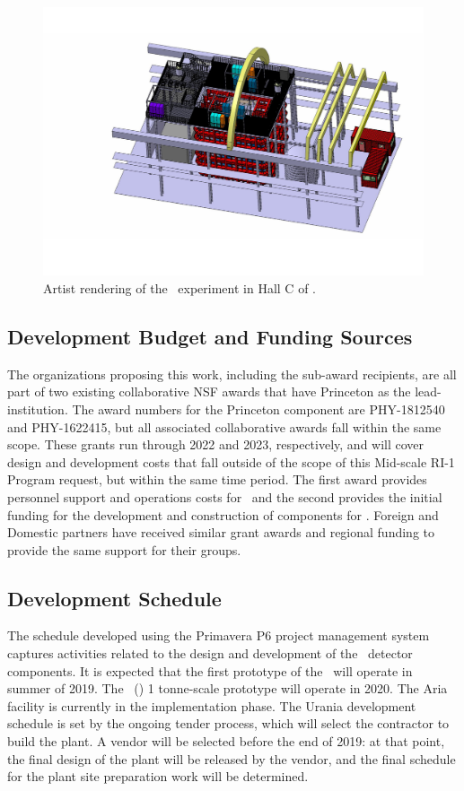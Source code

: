 \begin{figure}[htbp!]
\includegraphics[width=\textwidth]{./Figures/DSk-Overall.pdf}
\caption[Artist rendering of the \DSks\ experiment in Hall C of \LNGS]{Artist rendering of the \DSks\ experiment in Hall C of \LNGS.}
\label{fig:Overall-Design}
\end{figure}


\subsection{Development Budget and Funding Sources}
The organizations proposing this work, including the sub-award recipients, are all part of two existing collaborative NSF awards that have Princeton as the lead-institution.  The award numbers for the Princeton component are PHY-1812540 and PHY-1622415, but all associated collaborative awards fall within the same scope.  These grants run through 2022 and 2023, respectively, and will cover design and development costs that fall outside of the scope of this Mid-scale RI-1 Program request, but within the same time period.  The first award provides personnel support and operations costs for \DSks\ and the second provides the initial funding for the development and construction of components for \DSks.  Foreign and Domestic partners have received similar grant awards and regional funding to provide the same support for their groups.


\subsection{Development Schedule}
The schedule developed using the Primavera P6 project management system captures activities related to the design and development of the \DSks\ detector components.  It is expected that the first prototype of the \TPC\ will operate in summer of 2019. The \DSp\ (\DSps) 1 tonne-scale prototype will operate in 2020. The Aria facility is currently  in the implementation phase.  The Urania development schedule is set by the ongoing tender process, which will select the contractor to build the plant. A vendor will be selected before the end of 2019: at that point, the final design of the plant will be released by the vendor, and the final schedule for the plant site preparation work will be determined.